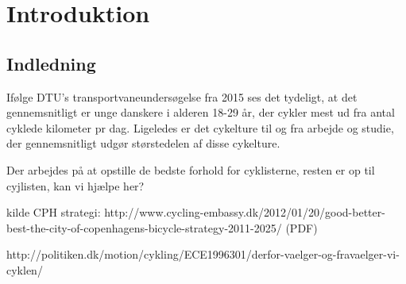 \chapter{Introduktion}\label{ch:introduction}
\section{Indledning}

Ifølge DTU’s transportvaneundersøgelse fra 2015 ses det tydeligt, at det gennemsnitligt er unge danskere i alderen 18-29 år, der cykler mest ud fra antal cyklede kilometer pr dag. Ligeledes er det cykelture til og fra arbejde og studie, der gennemsnitligt udgør størstedelen af disse cykelture.

Der arbejdes på at opstille de bedste forhold for cyklisterne, resten er op til cyjlisten, kan vi hjælpe her? 

kilde CPH strategi: http://www.cycling-embassy.dk/2012/01/20/good-better-best-the-city-of-copenhagens-bicycle-strategy-2011-2025/ (PDF)

http://politiken.dk/motion/cykling/ECE1996301/derfor-vaelger-og-fravaelger-vi-cyklen/

